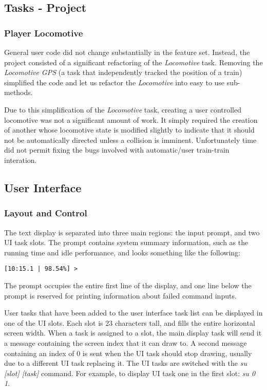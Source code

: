 \documentclass[twoside,a4paper]{refart}
\begin{document}
\subsection{Tasks - Project}

\subsubsection{Player Locomotive}
General user code did not change substantially in the feature set. Instead, the project consisted of a significant refactoring of the \textit{Locomotive} task. Removing the \textit{Locomotive GPS} (a task that independently tracked the position of a train) simplified the code and let us refactor the \textit{Locomotive} into easy to use sub-methods.

Due to this simplification of the \textit{Locomotive} task, creating a user controlled locomotive was not a significant amount of work. It simply required the creation of another whose locomotive state is modified slightly to indicate that it should not be automatically directed unless a collision is imminent. Unfortunately time did not permit fixing the bugs involved with automatic/user train-train interation. 

\subsection{User Interface}
\subsubsection{Layout and Control}
The text display is separated into three main regions: the input prompt, and two UI task slots. The prompt contains system summary information, such as the running time and idle performance, and looks something like the following:
\begin{verbatim}
[10:15.1 | 98.54%] > 
\end{verbatim}

The prompt occupies the entire first line of the display, and one line below the prompt is reserved for printing information about failed command inputs.

User tasks that have been added to the user interface task list can be displayed in one of the UI slots. Each slot is 23 characters tall, and fills the entire horizontal screen width. When a task is assigned to a slot, the main display task will send it a message containing the screen index that it can draw to. A second message containing an index of 0 is sent when the UI task should stop drawing, usually due to a different UI task replacing it. The UI tasks are switched with the \textit{su [slot] [task]} command. For example, to display UI task one in the first slot: \textit{su 0 1}.
\end{document}
